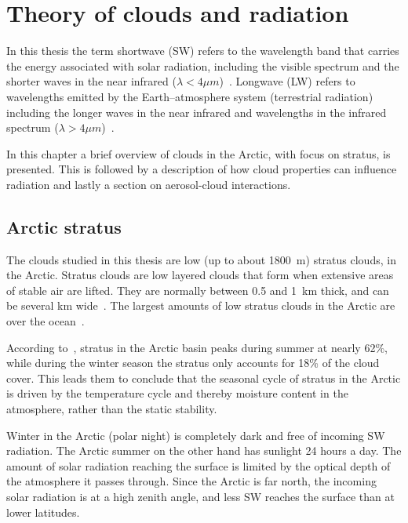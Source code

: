 \chapter{Theory of clouds and radiation}
\label{chap:theory}
In this thesis the term shortwave (SW) refers to the wavelength band that carries the energy associated with solar radiation, including the visible spectrum and the shorter waves in the near infrared ($\lambda < 4\mu m$)~\citep{Wallace2006}. Longwave (LW) refers to wavelengths emitted by the Earth--atmosphere system (terrestrial radiation) including the longer waves in the near infrared and wavelengths in the infrared spectrum ($\lambda > 4\mu m$)~\citep{Wallace2006}. 

In this chapter a brief overview of clouds in the Arctic, with focus on stratus, is presented. This is followed by a description of how cloud properties can influence radiation and lastly a section on aerosol-cloud interactions.

\section{Arctic stratus}
The clouds studied in this thesis are low (up to about 1800~m) stratus clouds, in the Arctic. Stratus clouds are low layered clouds that form when extensive areas of stable air are lifted. They are normally between 0.5 and 1~km thick, and can be several km wide~\citep{Aguado2010}. The largest amounts of low stratus clouds in the Arctic are over the ocean~\citep{Klein1993}.

According to~\citet{Klein1993}, stratus in the Arctic basin peaks during summer at nearly 62\%, while during the winter season the stratus only accounts for 18\% of the cloud cover. This leads them to conclude that the seasonal cycle of stratus in the Arctic is driven by the temperature cycle and thereby moisture content in the atmosphere, rather than the static stability.

Winter in the Arctic (polar night) is completely dark and free of incoming SW radiation. The Arctic summer on the other hand has sunlight 24 hours a day. The amount of solar radiation reaching the surface is limited by the optical depth of the atmosphere it passes through. Since the Arctic is far north, the incoming solar radiation is at a high zenith angle, and less SW reaches the surface than at lower latitudes.

